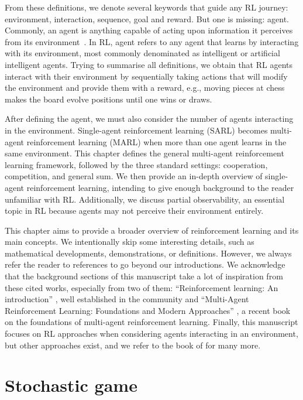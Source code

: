 From these definitions, we denote several keywords that guide any RL journey: environment, interaction, sequence, goal and reward.
But one is missing: agent.
Commonly, an agent is anything capable of acting upon information it perceives from its environment~\citep{russel2010}.
In RL, agent refers to any agent that learns by interacting with its environment, most commonly denominated as intelligent or artificial intelligent agents.
Trying to summarise all definitions, we obtain that RL agents interact with their environment by sequentially taking actions that will modify the environment and provide them with a reward, e.g., moving pieces at chess makes the board evolve positions until one wins or draws.

After defining the agent, we must also consider the number of agents interacting in the environment.
Single-agent reinforcement learning (SARL) becomes multi-agent reinforcement learning (MARL) when more than one agent learns in the same environment.
This chapter defines the general multi-agent reinforcement learning framework, followed by the three standard settings: cooperation, competition, and general sum.
We then provide an in-depth overview of single-agent reinforcement learning, intending to give enough background to the reader unfamiliar with RL.
Additionally, we discuss partial observability, an essential topic in RL because agents may not perceive their environment entirely.

This chapter aims to provide a broader overview of reinforcement learning and its main concepts.
We intentionally skip some interesting details, such as mathematical developments, demonstrations, or definitions.
However, we always refer the reader to references to go beyond our introductions.
We acknowledge that the background sections of this manuscript take a lot of inspiration from these cited works, especially from two of them: ``Reinforcement learning: An introduction'' \citep{sutton2018reinforcement}, well established in the community and ``Multi-Agent Reinforcement Learning: Foundations and Modern Approaches'' \citep{marl-book}, a recent book on the foundations of multi-agent reinforcement learning.
Finally, this manuscript focuses on RL approaches when considering agents interacting in an environment, but other approaches exist, and we refer to the book of \cite{russel2010} for many more.

\section{Stochastic game}
\label{sec:ch2_stochastic_Game}

